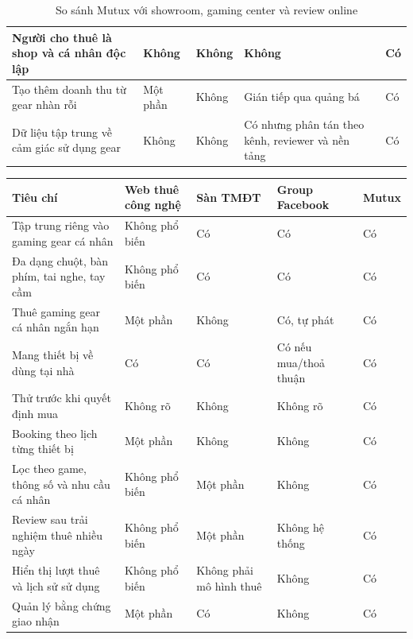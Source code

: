 \begin{table}[H]
\begin{tabular}{|p{4.4cm}|p{2.5cm}|p{2.5cm}|p{3.2cm}|p{2.2cm}|}
        \hline
        Người cho thuê là shop và cá nhân độc lập & Không & Không & Không & Có \\
        \hline
        Tạo thêm doanh thu từ gear nhàn rỗi & Một phần & Không & Gián tiếp qua quảng bá & Có \\
        \hline
        Dữ liệu tập trung về cảm giác sử dụng gear & Không & Không & Có nhưng phân tán theo kênh, reviewer và nền tảng & Có \\
        \hline
    \end{tabular}
    \renewcommand{\arraystretch}{1}
    \caption{So sánh Mutux với showroom, gaming center và review online}
\end{table}

\begin{table}[H]
    \centering
    \footnotesize
    \renewcommand{\arraystretch}{1.28}
    \setlength{\tabcolsep}{4pt}
    \begin{tabular}{|p{4.4cm}|p{2.8cm}|p{2.8cm}|p{2.8cm}|p{2.2cm}|}
        \hline
        \textbf{Tiêu chí} & \textbf{Web thuê công nghệ} & \textbf{Sàn TMĐT} & \textbf{Group Facebook} & \textbf{Mutux} \\
        \hline
        Tập trung riêng vào gaming gear cá nhân & Không phổ biến & Có & Có & Có \\
        \hline
        Đa dạng chuột, bàn phím, tai nghe, tay cầm & Không phổ biến & Có & Có & Có \\
        \hline
        Thuê gaming gear cá nhân ngắn hạn & Một phần & Không & Có, tự phát & Có \\
        \hline
        Mang thiết bị về dùng tại nhà & Có & Có & Có nếu mua/thoả thuận & Có \\
        \hline
        Thử trước khi quyết định mua & Không rõ & Không & Không rõ & Có \\
        \hline
        Booking theo lịch từng thiết bị & Một phần & Không & Không & Có \\
        \hline
        Lọc theo game, thông số và nhu cầu cá nhân & Không phổ biến & Một phần & Không & Có \\
        \hline
        Review sau trải nghiệm thuê nhiều ngày & Không phổ biến & Một phần & Không hệ thống & Có \\
        \hline
        Hiển thị lượt thuê và lịch sử sử dụng & Không phổ biến & Không phải mô hình thuê & Không & Có \\
        \hline
        Quản lý bằng chứng giao nhận & Một phần & Có & Không & Có \\
        \hline

\end{tabular}
\end{table}
